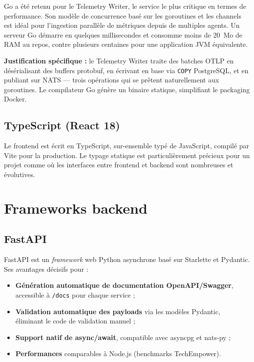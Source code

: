 Go a été retenu pour le Telemetry Writer, le service le plus critique en termes
de performance. Son modèle de concurrence basé sur les goroutines et les channels
est idéal pour l'ingestion parallèle de métriques depuis de multiples agents.
Un serveur Go démarre en quelques millisecondes et consomme moins de 20~Mo de RAM
au repos, contre plusieurs centaines pour une application JVM équivalente.

\textbf{Justification spécifique :} le Telemetry Writer traite des batches OTLP
en désérialisant des buffers protobuf, en écrivant en base via \texttt{COPY}
PostgreSQL, et en publiant sur NATS --- trois opérations qui se prêtent
naturellement aux goroutines. Le compilateur Go génère un binaire statique,
simplifiant le packaging Docker.

\subsection{TypeScript (React 18)}

Le frontend est écrit en TypeScript, sur-ensemble typé de JavaScript, compilé
par Vite pour la production. Le typage statique est particulièrement précieux
pour un projet comme \caimp{} où les interfaces entre frontend et backend sont
nombreuses et évolutives.

\section{Frameworks backend}

\subsection{FastAPI}

FastAPI \cite{fastapi_docs} est un \textit{framework} web Python asynchrone
basé sur Starlette et Pydantic. Ses avantages décisifs pour \caimp{} :

\begin{itemize}
  \item \textbf{Génération automatique de documentation OpenAPI/Swagger}, accessible
    à \texttt{/docs} pour chaque service ;
  \item \textbf{Validation automatique des payloads} via les modèles Pydantic,
    éliminant le code de validation manuel ;
  \item \textbf{Support natif de async/await}, compatible avec asyncpg et nats-py ;
  \item \textbf{Performances} comparables à Node.js (benchmarks TechEmpower).
\end{itemize}


